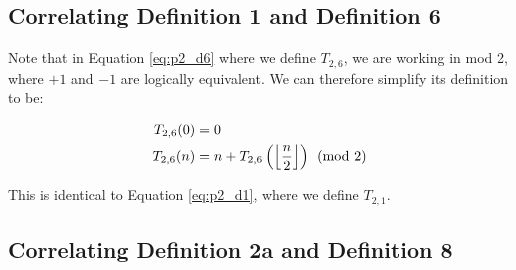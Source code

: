 \documentclass[conference]{IEEEtran}
\begin{document}
\subsection{Correlating Definition 1 and Definition 6}

Note that in Equation \ref{eq:p2_d6} where we define $T_{2,6}$, we are working in mod 2, where $+1$ and $-1$ are logically equivalent. We can therefore simplify its definition to be:

\begin{equation}
    \label{eq:p2d06s}
    \begin{aligned}
T_{2,6}(0) &= 0 \\
T_{2,6}(n) &= n + T_{2,6}\left(\floor{\dfrac{n}{2}}\right) \pmod{2}
    \end{aligned}
\end{equation}

This is identical to Equation \ref{eq:p2_d1}, where we define $T_{2,1}$.

\subsection{Correlating Definition 2a and Definition 8}
\end{document}
